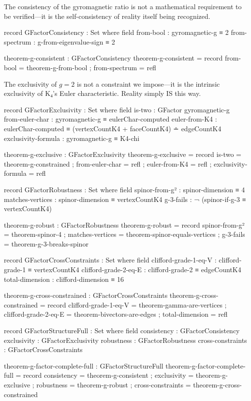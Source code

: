 \documentclass[11pt,a4paper]{book}
\begin{document}
The consistency of the gyromagnetic ratio is not a mathematical requirement to be verified—it is the self-consistency of reality itself being recognized.

\begin{code}
record GFactorConsistency : Set where
  field
    from-bool        : gyromagnetic-g ≡ 2
    from-spectrum    : g-from-eigenvalue-sign ≡ 2

theorem-g-consistent : GFactorConsistency
theorem-g-consistent = record
  { from-bool = theorem-g-from-bool
  ; from-spectrum = refl
  }
\end{code}

The exclusivity of $g = 2$ is not a constraint we impose—it is the intrinsic exclusivity of K₄'s Euler characteristic. Reality simply IS this way.

\begin{code}
record GFactorExclusivity : Set where
  field
    is-two              : GFactor gyromagnetic-g
    from-euler-char     : gyromagnetic-g ≡ eulerChar-computed
    euler-from-K4       : eulerChar-computed ≡ (vertexCountK4 + faceCountK4) ∸ edgeCountK4
    exclusivity-formula : gyromagnetic-g ≡ K4-chi

theorem-g-exclusive : GFactorExclusivity
theorem-g-exclusive = record
  { is-two = theorem-g-constrained
  ; from-euler-char = refl
  ; euler-from-K4 = refl
  ; exclusivity-formula = refl
  }

record GFactorRobustness : Set where
  field
    spinor-from-g²   : spinor-dimension ≡ 4
    matches-vertices : spinor-dimension ≡ vertexCountK4
    g-3-fails        : ¬ (spinor-if-g-3 ≡ vertexCountK4)

theorem-g-robust : GFactorRobustness
theorem-g-robust = record
  { spinor-from-g² = theorem-spinor-4
  ; matches-vertices = theorem-spinor-equals-vertices
  ; g-3-fails = theorem-g-3-breaks-spinor
  }

record GFactorCrossConstraints : Set where
  field
    clifford-grade-1-eq-V : clifford-grade-1 ≡ vertexCountK4
    clifford-grade-2-eq-E : clifford-grade-2 ≡ edgeCountK4
    total-dimension       : clifford-dimension ≡ 16

theorem-g-cross-constrained : GFactorCrossConstraints
theorem-g-cross-constrained = record
  { clifford-grade-1-eq-V = theorem-gamma-are-vertices
  ; clifford-grade-2-eq-E = theorem-bivectors-are-edges
  ; total-dimension = refl
  }
\end{code}

\begin{code}
record GFactorStructureFull : Set where
  field
    consistency      : GFactorConsistency
    exclusivity      : GFactorExclusivity
    robustness       : GFactorRobustness
    cross-constraints : GFactorCrossConstraints

theorem-g-factor-complete-full : GFactorStructureFull
theorem-g-factor-complete-full = record
  { consistency = theorem-g-consistent
  ; exclusivity = theorem-g-exclusive
  ; robustness = theorem-g-robust
  ; cross-constraints = theorem-g-cross-constrained
  }
\end{code}
\end{document}
